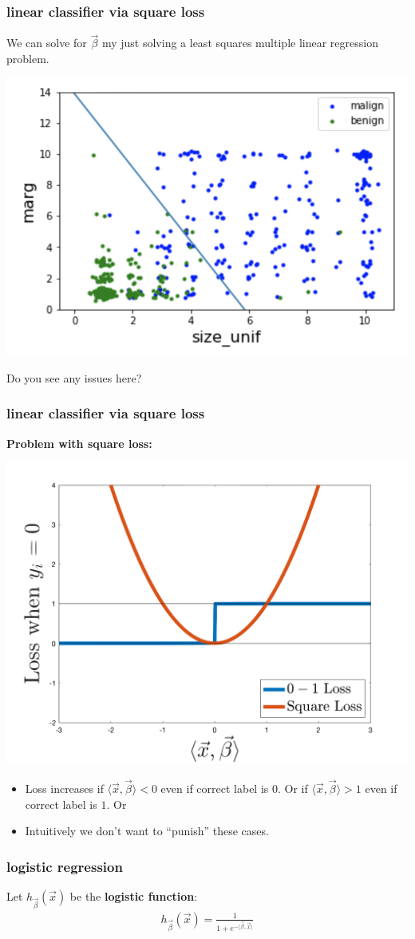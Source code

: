 \documentclass[handout,compress]{beamer}
\begin{document}
\begin{frame}
	\frametitle{linear classifier via square loss}
	We can solve for $\vec{\beta}$ my just solving a least squares multiple linear regression problem.
	\begin{center}
		\includegraphics[width=.5\textwidth]{squareloss.png}
		\vspace{-.5em}
	\end{center}
	Do you see any issues here?
\end{frame}

\begin{frame}
	\frametitle{linear classifier via square loss}
	\textbf{Problem with square loss:}
	\vspace{-.5em}
	\begin{center}
		\includegraphics[width=.5\textwidth]{square_loss_compare.png}
		\vspace{-.5em}
	\end{center}
	\begin{itemize}
		\item Loss increases if $\langle \vec{x},\vec{\beta}\rangle < 0$ even if correct label is $0$. Or if $\langle \vec{x},\vec{\beta}\rangle > 1$ even if correct label is $1$. Or
		\item Intuitively we don't want to ``punish'' these cases.
	\end{itemize}
\end{frame}

\begin{frame}[t]
	\frametitle{logistic regression}
	Let $h_{\vec{\beta}}(\vec{x})$ be the \textbf{\alert{logistic function}}:
	\begin{align*}
		h_{\vec{\beta}}(\vec{x}) = \frac{1}{1 + e^{-\langle\vec{\beta},\vec{x}\rangle}}
	\end{align*}
\end{frame}
\end{document}
